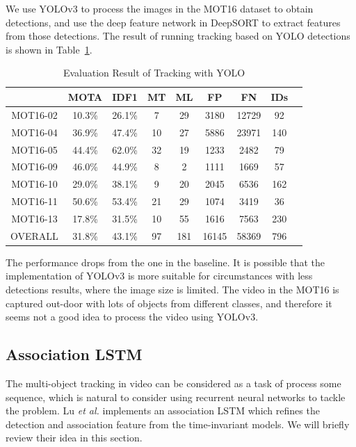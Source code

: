 \documentclass[conference]{IEEEtran}
\begin{document}
We use YOLOv3\cite{yolov3} to process the images in the MOT16 dataset to obtain detections, and use the deep feature network in DeepSORT to extract features from those detections.
The result of running tracking based on YOLO detections is shown in Table~\ref{tab:eval-yolo}.

\begin{table}[h]
    \caption{Evaluation Result of Tracking with YOLO}
    \label{tab:eval-yolo}
    \begin{tabular}{ccccccccc}
        \hline
        & MOTA & IDF1 & MT & ML & FP & FN & IDs\\\hline
        MOT16-02 & 10.3\% & 26.1\% & 7 & 29 & 3180 & 12729 & 92\\
        MOT16-04 & 36.9\% & 47.4\% & 10 & 27 & 5886 & 23971 & 140\\
        MOT16-05 & 44.4\% & 62.0\% & 32 & 19 & 1233 & 2482 & 79\\
        MOT16-09 & 46.0\% & 44.9\% & 8 & 2 & 1111 & 1669 & 57\\
        MOT16-10 & 29.0\% & 38.1\% & 9 & 20 & 2045 & 6536 & 162\\
        MOT16-11 & 50.6\% & 53.4\% & 21 & 29 & 1074 & 3419 & 36\\
        MOT16-13 & 17.8\% & 31.5\% & 10 & 55 & 1616 & 7563 & 230\\
        OVERALL & 31.8\% & 43.1\% & 97 & 181 & 16145 & 58369 & 796\\\hline
    \end{tabular}
\end{table}

The performance drops from the one in the baseline.
It is possible that the implementation of YOLOv3 is more suitable for circumstances with less detections results, where the image size is limited.
The video in the MOT16 is captured out-door with lots of objects from different classes, and therefore it seems not a good idea to process the video using YOLOv3.

\subsection{Association LSTM}
The multi-object tracking in video can be considered as a task of process some sequence, which is natural to consider using recurrent neural networks to tackle the problem.
Lu \textit{et al.} \cite{lu2017online} implements an association LSTM which refines the detection and association feature from the time-invariant models.
We will briefly review their idea in this section.
\end{document}
